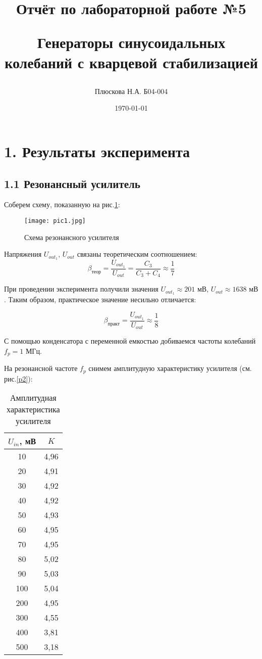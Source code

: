\documentclass[a4paper,12pt]{report}
\title{Отчёт по лабораторной работе №5

Генераторы синусоидальных колебаний с кварцевой стабилизацией}
\author{Плюскова Н.А. Б04-004 }
\date{\today}
\begin{document}
\maketitle

\section*{1. Результаты эксперимента}
\subsection*{1.1 Резонансный усилитель}

Соберем схему, показанную на рис.\ref{p1}:

\begin{figure}[H]
    \texttt{[image: pic1.jpg]}
    \caption{Схема резонансного усилителя}
    \label{p1}
\end{figure}


Напряжения $U_{out_1}$, $U_{out}$ связаны теоретическим соотношением:
    \[ \beta_{теор}= \frac{U_{out_1}}{U_{out}} = \frac{C_3}{C_3 + C_4} \approx \frac{1}{7} \]

При проведении эксперимента получили значения $U_{out_1} \approx 201 \text{ мВ}$, $U_{out} \approx 1638 \text{ мВ}$. Таким образом, практическое значение несильно отличается:

    \[ \beta_{практ}= \frac{U_{out_1}}{U_{out}} \approx \frac{1}{8} \]

С помощью конденсатора с переменной емкостью добиваемся частоты колебаний $f_p = 1 \text{ МГц}$. 

На резонансной частоте $f_p$ снимем амплитудную характеристику усилителя (см. рис.\ref{p2}):

\begin{table}[H]
\begin{tabular}{|c|c|}
\hline
$U_{in}$, мВ & $K$    \\ \hline
10        & 4,96 \\ \hline
20        & 4,91 \\ \hline
30        & 4,92 \\ \hline
40        & 4,92 \\ \hline
50        & 4,93 \\ \hline
60        & 4,95 \\ \hline
70        & 4,95 \\ \hline
80        & 5,02 \\ \hline
90        & 5,03 \\ \hline
100       & 5,04 \\ \hline
200       & 4,95 \\ \hline
300       & 4,55 \\ \hline
400       & 3,81 \\ \hline
500       & 3,18 \\ \hline
\end{tabular}
\caption{Амплитудная характеристика усилителя}
\end{table}
\end{document}
